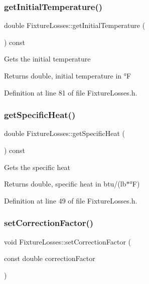 \subsubsection{\texorpdfstring{get\+Initial\+Temperature()}{getInitialTemperature()}}
{\footnotesize\ttfamily double Fixture\+Losses\+::get\+Initial\+Temperature (\begin{DoxyParamCaption}{ }\end{DoxyParamCaption}) const\hspace{0.3cm}{\ttfamily [inline]}}

Gets the initial temperature \begin{DoxyReturn}{Returns}
double, initial temperature in °F 
\end{DoxyReturn}


Definition at line 81 of file Fixture\+Losses.\+h.

\mbox{\label{class_fixture_losses_adb3ea84a757bac31c52784cdd15349ea}} 
\subsubsection{\texorpdfstring{get\+Specific\+Heat()}{getSpecificHeat()}}
{\footnotesize\ttfamily double Fixture\+Losses\+::get\+Specific\+Heat (\begin{DoxyParamCaption}{ }\end{DoxyParamCaption}) const\hspace{0.3cm}{\ttfamily [inline]}}

Gets the specific heat \begin{DoxyReturn}{Returns}
double, specific heat in btu/(lb$\ast$°F) 
\end{DoxyReturn}


Definition at line 49 of file Fixture\+Losses.\+h.

\mbox{\label{class_fixture_losses_a3a3dd839d71adb630e7ce76644f18098}} 
\subsubsection{\texorpdfstring{set\+Correction\+Factor()}{setCorrectionFactor()}}
{\footnotesize\ttfamily void Fixture\+Losses\+::set\+Correction\+Factor (\begin{DoxyParamCaption}\item[{const double}]{correction\+Factor }\end{DoxyParamCaption})\hspace{0.3cm}{\ttfamily [inline]}}


